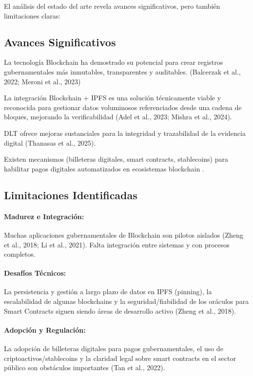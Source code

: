 \documentclass[
    letterpaper, 
    man,   
    spanish,
    12pt,
    donotrepeattitle,
    floatsintext,
    hidelinks %
]{apa7}
\begin{document}
El análisis del estado del arte revela avances significativos, pero también limitaciones claras: 
  

\subsection{Avances Significativos} 

La tecnología Blockchain ha demostrado su potencial para crear registros gubernamentales más inmutables, transparentes y auditables. (Balcerzak et al., 2022; Meroni et al., 2023) 

La integración Blockchain + IPFS es una solución técnicamente viable y reconocida para gestionar datos voluminosos referenciados desde una cadena de bloques, mejorando la verificabilidad (Adel et al., 2023; Mishra et al., 2024). 

DLT ofrece mejoras sustanciales para la integridad y trazabilidad de la evidencia digital (Thanasas et al., 2025). 

Existen mecanismos (billeteras digitales, smart contracts, stablecoins) para habilitar pagos digitales automatizados en ecosistemas blockchain \parencite{antonopoulos2023mastering}.

\subsection{Limitaciones Identificadas} 
\paragraph{Madurez e Integración:}
Muchas aplicaciones gubernamentales de Blockchain son pilotos aislados (Zheng et al., 2018; Li et al., 2021). Falta integración entre sistemas y con procesos completos. 

\paragraph{Desafíos Técnicos: }
La persistencia y gestión a largo plazo de datos en IPFS (pinning), la escalabilidad de algunas blockchains y la seguridad/fiabilidad de los oráculos para Smart Contracts siguen siendo áreas de desarrollo activo (Zheng et al., 2018). 

\paragraph{Adopción y Regulación:}
La adopción de billeteras digitales para pagos gubernamentales, el uso de criptoactivos/stablecoins y la claridad legal sobre smart contracts en el sector público son obstáculos importantes (Tan et al., 2022).
\end{document}
